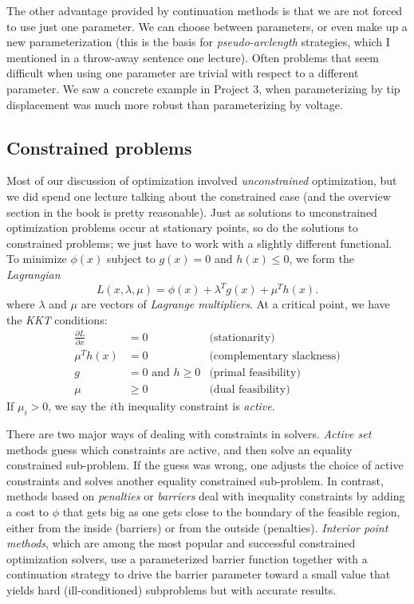 \documentclass[12pt, leqno]{article}
\begin{document}
The other advantage provided by continuation methods is that we are
not forced to use just one parameter.  We can choose between
parameters, or even make up a new parameterization (this is the basis
for {\em pseudo-arclength} strategies, which I mentioned in a
throw-away sentence one lecture).  Often problems that seem difficult
when using one parameter are trivial with respect to a different
parameter.  We saw a concrete example in Project 3, when
parameterizing by tip displacement was much more robust than
parameterizing by voltage.

\subsection{Constrained problems}

Most of our discussion of optimization involved {\em unconstrained}
optimization, but we did spend one lecture talking about the
constrained case (and the overview section in the book is pretty
reasonable).  Just as solutions to unconstrained optimization problems
occur at stationary points, so do the solutions to constrained
problems; we just have to work with a slightly different functional.
To minimize $\phi(x)$ subject to $g(x) = 0$ and $h(x) \leq 0$,
we form the {\em Lagrangian}
\[
  L(x,\lambda,\mu) = \phi(x) + \lambda^T g(x) + \mu^T h(x).
\]
where $\lambda$ and $\mu$ are vectors of {\em Lagrange multipliers}.
At a critical point, we have the {\em KKT} conditions:
\begin{align*}
  \frac{\partial L}{\partial x} &= 0 & \mbox{(stationarity)}\\
  \mu^T h(x) & = 0 & \mbox{(complementary slackness)} \\
  g &= 0 \mbox{ and } h \geq 0 & \mbox{(primal feasibility)} \\
  \mu &\geq 0 & \mbox{(dual feasibility)}
\end{align*}
If $\mu_i > 0$, we say the $i$th inequality constraint is {\em active}.

There are two major ways of dealing with constraints in solvers.
{\em Active set} methods guess which constraints are active,
and then solve an equality constrained sub-problem.  If the guess
was wrong, one adjusts the choice of active constraints and solves
another equality constrained sub-problem.  In contrast, methods
based on {\em penalties} or {\em barriers} deal with inequality
constraints by adding a cost to $\phi$ that gets big as one
gets close to the boundary of the feasible region, either from the
inside (barriers) or from the outside (penalties).  
{\em Interior point methods}, which are among the most popular
and successful constrained optimization solvers, use a parameterized
barrier function together with a continuation strategy to drive the
barrier parameter toward a small value that yields hard
(ill-conditioned) subproblems but with accurate results.
\end{document}

